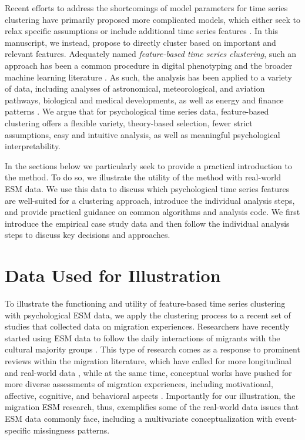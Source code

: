 \documentclass[man, 12pt, a4paper, mask, floatsintext]{apa7}
\theoremstyle{break}
\theoremstyle{plain}
\begin{document}
Recent efforts to address the shortcomings of model parameters for time series clustering have primarily proposed more complicated models, which either seek to relax specific assumptions \citep[e.g.,][]{denteuling2021} or include additional time series features \citep[e.g., see][]{krone2018, gates2017}. In this manuscript, we instead, propose to directly cluster based on important and relevant features. Adequately named \textit{feature-based time series clustering}, such an approach has been a common procedure in digital phenotyping \citep[][]{loftus2022} and the broader machine learning literature \citep[][]{maharaj2019}. As such, the analysis has been applied to a variety of data, including analyses of astronomical, meteorological, and aviation pathways, biological and medical developments, as well as energy and finance patterns \citep{Aghabozorgi2015}. We argue that for psychological time series data, feature-based clustering offers a flexible variety, theory-based selection, fewer strict assumptions, easy and intuitive analysis, as well as meaningful psychological interpretability. 

In the sections below we particularly seek to provide a practical introduction to the method. To do so, we illustrate the utility of the method with real-world ESM data. We use this data to discuss which psychological time series features are well-suited for a clustering approach, introduce the individual analysis steps, and provide practical guidance on common algorithms and analysis code. We first introduce the empirical case study data and then follow the individual analysis steps to discuss key decisions and approaches.

\section{Data Used for Illustration}

To illustrate the functioning and utility of feature-based time series clustering with psychological ESM data, we apply the clustering process to a recent set of studies that collected data on migration experiences. Researchers have recently started using ESM data to follow the daily interactions of migrants with the cultural majority groups \citep[e.g.,][]{Keil2020}. This type of research comes as a response to prominent reviews within the migration literature, which have called for more longitudinal \citep[e.g.,][]{Ward2019} and real-world data \citep[e.g.,][]{McKeown2017}, while at the same time, conceptual works have pushed for more diverse assessments of migration experiences, including motivational, affective, cognitive, and behavioral aspects \citep[e.g.,][]{Kreienkamp2022d}. Importantly for our illustration, the migration ESM research, thus, exemplifies some of the real-world data issues that ESM data commonly face, including a multivariate conceptualization with event-specific missingness patterns.
\end{document}
